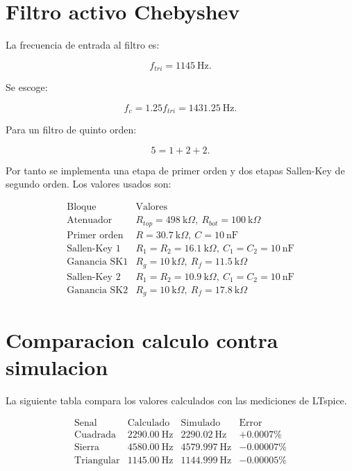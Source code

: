 \documentclass[11pt,letterpaper]{article}
\begin{document}
\section{Filtro activo Chebyshev}

La frecuencia de entrada al filtro es:

\[
f_{tri}=1145~\text{Hz}.
\]

Se escoge:

\[
f_c=1.25f_{tri}=1431.25~\text{Hz}.
\]

Para un filtro de quinto orden:

\[
5=1+2+2.
\]

Por tanto se implementa una etapa de primer orden y dos etapas Sallen-Key de
segundo orden. Los valores usados son:

\[
\begin{array}{c|c}
\text{Bloque} & \text{Valores} \\
\hline
\text{Atenuador} & R_{top}=498~\text{k}\Omega,\ R_{bot}=100~\text{k}\Omega\\
\text{Primer orden} & R=30.7~\text{k}\Omega,\ C=10~\text{nF}\\
\text{Sallen-Key 1} & R_1=R_2=16.1~\text{k}\Omega,\ C_1=C_2=10~\text{nF}\\
\text{Ganancia SK1} & R_g=10~\text{k}\Omega,\ R_f=11.5~\text{k}\Omega\\
\text{Sallen-Key 2} & R_1=R_2=10.9~\text{k}\Omega,\ C_1=C_2=10~\text{nF}\\
\text{Ganancia SK2} & R_g=10~\text{k}\Omega,\ R_f=17.8~\text{k}\Omega
\end{array}
\]

\section{Comparacion calculo contra simulacion}

La siguiente tabla compara los valores calculados con las mediciones de
LTspice.

\[
\begin{array}{l|r|r|r}
\text{Senal} & \text{Calculado} & \text{Simulado} & \text{Error}\\
\hline
\text{Cuadrada} & 2290.00~\text{Hz} & 2290.02~\text{Hz} & +0.0007\%\\
\text{Sierra} & 4580.00~\text{Hz} & 4579.997~\text{Hz} & -0.00007\%\\
\text{Triangular} & 1145.00~\text{Hz} & 1144.999~\text{Hz} & -0.00005\%
\end{array}
\]
\end{document}
